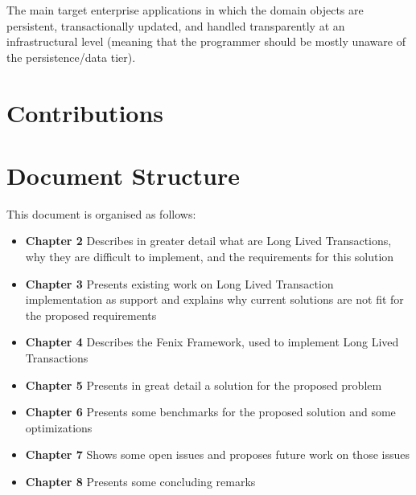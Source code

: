 The main target enterprise applications in
which the domain objects are persistent, transactionally updated, and
handled transparently at an infrastructural level (meaning that the
programmer should be mostly unaware of the persistence/data tier).

\section{Contributions}

\section{Document Structure}

This document is organised as follows:

\begin{itemize}

\item {\bf Chapter 2} Describes in greater detail what are Long Lived
  Transactions, why they are difficult to implement, and the
  requirements for this solution

\item {\bf Chapter 3} Presents existing work on Long Lived Transaction
  implementation as support and explains why current solutions are not
  fit for the proposed requirements

\item {\bf Chapter 4} Describes the Fenix Framework, used to implement
  Long Lived Transactions

\item {\bf Chapter 5} Presents in great detail a solution for the
  proposed problem

\item {\bf Chapter 6} Presents some benchmarks for the proposed
  solution and some optimizations

\item {\bf Chapter 7} Shows some open issues and proposes future work
  on those issues

\item {\bf Chapter 8} Presents some concluding remarks

\end{itemize}